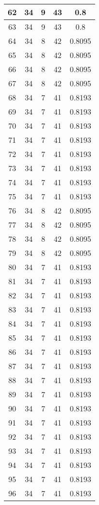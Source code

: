 \documentclass[letterpaper, 12pt]{article}
\begin{document}
\begin{longtable}{|c|c|c|c|c|}
\hline
62 & 34 & 9 & 43 & 0.8 \\
\hline
63 & 34 & 9 & 43 & 0.8 \\
\hline
64 & 34 & 8 & 42 & 0.8095 \\
\hline
65 & 34 & 8 & 42 & 0.8095 \\
\hline
66 & 34 & 8 & 42 & 0.8095 \\
\hline
67 & 34 & 8 & 42 & 0.8095 \\
\hline
68 & 34 & 7 & 41 & 0.8193 \\
\hline
69 & 34 & 7 & 41 & 0.8193 \\
\hline
70 & 34 & 7 & 41 & 0.8193 \\
\hline
71 & 34 & 7 & 41 & 0.8193 \\
\hline
72 & 34 & 7 & 41 & 0.8193 \\
\hline
73 & 34 & 7 & 41 & 0.8193 \\
\hline
74 & 34 & 7 & 41 & 0.8193 \\
\hline
75 & 34 & 7 & 41 & 0.8193 \\
\hline
76 & 34 & 8 & 42 & 0.8095 \\
\hline
77 & 34 & 8 & 42 & 0.8095 \\
\hline
78 & 34 & 8 & 42 & 0.8095 \\
\hline
79 & 34 & 8 & 42 & 0.8095 \\
\hline
80 & 34 & 7 & 41 & 0.8193 \\
\hline
81 & 34 & 7 & 41 & 0.8193 \\
\hline
82 & 34 & 7 & 41 & 0.8193 \\
\hline
83 & 34 & 7 & 41 & 0.8193 \\
\hline
84 & 34 & 7 & 41 & 0.8193 \\
\hline
85 & 34 & 7 & 41 & 0.8193 \\
\hline
86 & 34 & 7 & 41 & 0.8193 \\
\hline
87 & 34 & 7 & 41 & 0.8193 \\
\hline
88 & 34 & 7 & 41 & 0.8193 \\
\hline
89 & 34 & 7 & 41 & 0.8193 \\
\hline
90 & 34 & 7 & 41 & 0.8193 \\
\hline
91 & 34 & 7 & 41 & 0.8193 \\
\hline
92 & 34 & 7 & 41 & 0.8193 \\
\hline
93 & 34 & 7 & 41 & 0.8193 \\
\hline
94 & 34 & 7 & 41 & 0.8193 \\
\hline
95 & 34 & 7 & 41 & 0.8193 \\
\hline
96 & 34 & 7 & 41 & 0.8193 \\

\end{longtable}
\end{document}

